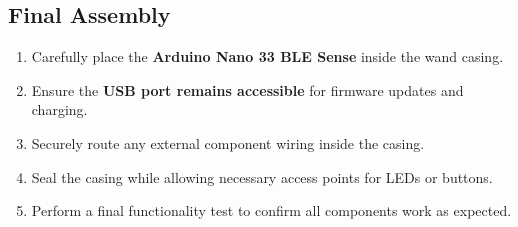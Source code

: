 \subsection{Final Assembly}
\begin{enumerate}
	\item Carefully place the \textbf{Arduino Nano 33 BLE Sense} inside the wand casing.
	\item Ensure the \textbf{USB port remains accessible} for firmware updates and charging.
	\item Securely route any external component wiring inside the casing.
	\item Seal the casing while allowing necessary access points for LEDs or buttons.
	\item Perform a final functionality test to confirm all components work as expected.
\end{enumerate}
